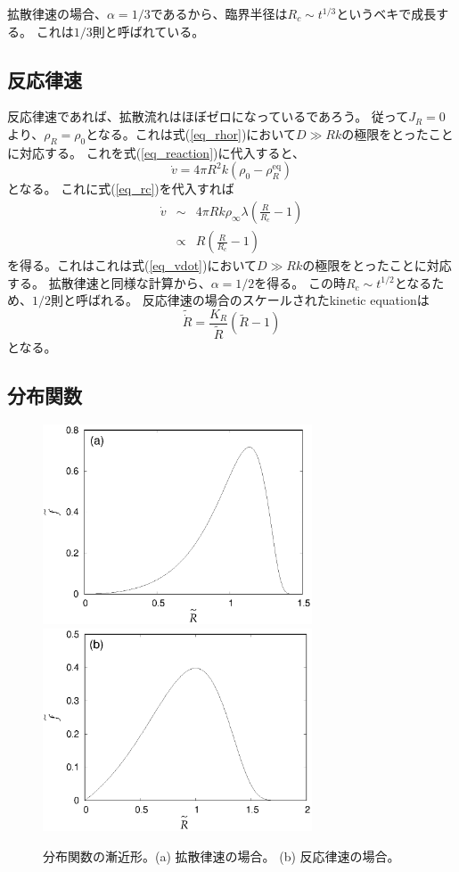 \documentclass{jarticle}
\begin{document}
拡散律速の場合、$\alpha =1/3$であるから、臨界半径は$R_c \sim t^{1/3}$というベキで成長する。
これは$1/3$則と呼ばれている。

\subsection{反応律速}

反応律速であれば、拡散流れはほぼゼロになっているであろう。
従って$J_R=0$より、$\rho_R = \rho_0$となる。これは式(\ref{eq_rhor})において$D\gg Rk$の極限をとったことに対応する。
これを式(\ref{eq_reaction})に代入すると、
\begin{equation}
    \dot{v} = 4\pi R^2 k(\rho_0 - \rho_R^{\mathrm{eq}})
\end{equation}
となる。
これに式(\ref{eq_rc})を代入すれば
\begin{eqnarray}
    \dot{v} &\sim& 4 \pi R k \rho_\infty \lambda \left(\frac{R}{R_c}  -1 \right)\\
    &\propto & R \left(\frac{R}{R_c}  -1 \right)
\end{eqnarray}
を得る。これはこれは式(\ref{eq_vdot})において$D\gg Rk$の極限をとったことに対応する。
拡散律速と同様な計算から、$\alpha=1/2$を得る。
この時$R_c\sim t^{1/2}$となるため、$1/2$則と呼ばれる。
反応律速の場合のスケールされたkinetic equationは
\begin{equation}
    \tilde{\dot{R}} = \frac{K_R}{\tilde{R}} (\tilde{R} - 1)
\end{equation}
となる。


\subsection{分布関数}

\begin{figure}[tb]
    \includegraphics[width=8cm]{d-limit.eps}
    \includegraphics[width=8cm]{r-limit.eps}
    \caption{
        分布関数の漸近形。(a) 拡散律速の場合。 (b) 反応律速の場合。
    }
    \label{fig_scale}
\end{figure}
\end{document}
